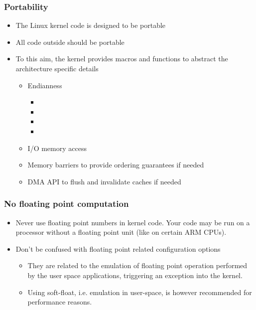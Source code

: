 \begin{frame}
  \frametitle{Portability}
  \begin{itemize}
  \item The Linux kernel code is designed to be portable
  \item All code outside  should be portable
  \item To this aim, the kernel provides macros and functions to
    abstract the architecture specific details
    \begin{itemize}
    \item Endianness
      \begin{itemize}
      \item {}
      \item {}
      \item {}
      \item {}
      \end{itemize}
    \item I/O memory access
    \item Memory barriers to provide ordering guarantees if needed
    \item DMA API to flush and invalidate caches if needed
    \end{itemize}
  \end{itemize}
\end{frame}

\begin{frame}
  \frametitle{No floating point computation}
  \begin{itemize}
  \item Never use floating point numbers in kernel code. Your code may
    be run on a processor without a floating point unit (like on
    certain ARM CPUs).
  \item Don't be confused with floating point related configuration
    options
    \begin{itemize}
    \item They are related to the emulation of floating point
      operation performed by the user space applications, triggering
      an exception into the kernel.
    \item Using soft-float, i.e. emulation in user-space, is however
      recommended for performance reasons.
    \end{itemize}
  \end{itemize}
\end{frame}


